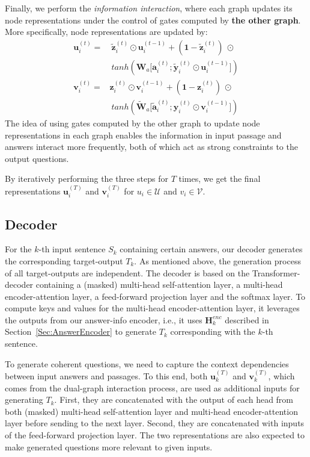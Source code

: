 \documentclass[11pt,a4paper]{article}
\begin{document}
Finally, we perform the \textit{information interaction}, where each graph updates its node representations under the control of gates computed by \textbf{the other graph}. More specifically, node representations are updated by:
\begin{equation} \label{Eq:last}
\begin{split}
\bm u_i^{(t)} =& ~\tilde{\bm z}_i^{(t)} \odot \bm u_i^{(t-1)} + (\bm 1 - \tilde{\bm z}_i^{(t)}) ~\odot \\
& ~ tanh (\bm W_a \bm [\bm a_i^{(t)}; \tilde{\bm y}_i^{(t)} \odot \bm u_i^{(t-1)}]) \\
\bm v_i^{(t)} =& \bm z_i^{(t)} \odot \bm v_i^{(t-1)} + (\bm 1 - \bm z_i^{(t)}) ~\odot \\
& ~ tanh (\tilde{\bm W}_a \bm [\tilde{\bm a}_i^{(t)}; \bm y_i^{(t)} \odot \bm v_i^{(t-1)}])
\end{split}
\end{equation}
The idea of using gates computed by the other graph to update node representations in each graph enables the information in input passage and answers interact more frequently, both of which act as strong constraints to the output questions. 

By iteratively performing the three steps for $T$ times, we get the final representations $\bm u_i^{(T)}$ and $\bm v_i^{(T)}$ for $u_i \in \mathcal{U}$ and $v_i \in \mathcal{V}$.

\subsection{Decoder}
For the $k$-th input sentence $S_k$ containing certain answers, our decoder generates the corresponding target-output $T_k$. As mentioned above, the generation process of all target-outputs are independent.
The decoder is based on the Transformer-decoder containing a (masked) multi-head self-attention layer, a multi-head encoder-attention layer, a feed-forward projection layer and the softmax layer.
To compute keys and values for the multi-head encoder-attention layer, it leverages the outputs from our answer-info encoder, i.e., it uses $\bm{H}_k^{enc}$ described in Section~\ref{Sec:AnswerEncoder} to generate $T_k$ corresponding with the $k$-th sentence.

To generate coherent questions, we need to capture the context dependencies between input answers and passages. To this end, both $\bm u_k^{(T)}$ and $\bm v_k^{(T)}$, which comes from the dual-graph interaction process, are used as additional inputs for generating $T_k$.  
First, they are concatenated with the output of each head from both (masked) multi-head self-attention layer and multi-head encoder-attention layer before sending to the next layer.
Second, they are concatenated with inputs of the feed-forward projection layer.
The two representations are also expected to make generated questions more relevant to given inputs.
\end{document}
